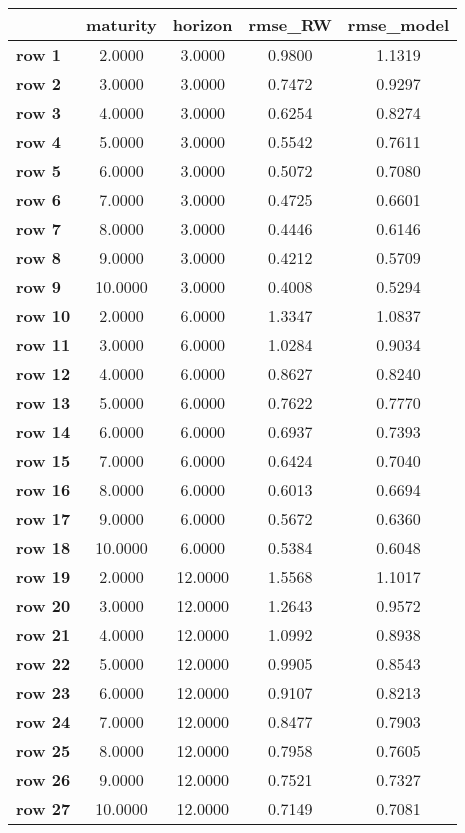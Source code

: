 \begin{tiny}\begin{tabular}{|l|c|c|c|c|}
\hline
&\textbf{maturity}&\textbf{horizon}&\textbf{rmse_RW}&\textbf{rmse_model}\\\hline
\textbf{row 1}&2.0000&3.0000&0.9800&1.1319\\\hline
\textbf{row 2}&3.0000&3.0000&0.7472&0.9297\\\hline
\textbf{row 3}&4.0000&3.0000&0.6254&0.8274\\\hline
\textbf{row 4}&5.0000&3.0000&0.5542&0.7611\\\hline
\textbf{row 5}&6.0000&3.0000&0.5072&0.7080\\\hline
\textbf{row 6}&7.0000&3.0000&0.4725&0.6601\\\hline
\textbf{row 7}&8.0000&3.0000&0.4446&0.6146\\\hline
\textbf{row 8}&9.0000&3.0000&0.4212&0.5709\\\hline
\textbf{row 9}&10.0000&3.0000&0.4008&0.5294\\\hline
\textbf{row 10}&2.0000&6.0000&1.3347&1.0837\\\hline
\textbf{row 11}&3.0000&6.0000&1.0284&0.9034\\\hline
\textbf{row 12}&4.0000&6.0000&0.8627&0.8240\\\hline
\textbf{row 13}&5.0000&6.0000&0.7622&0.7770\\\hline
\textbf{row 14}&6.0000&6.0000&0.6937&0.7393\\\hline
\textbf{row 15}&7.0000&6.0000&0.6424&0.7040\\\hline
\textbf{row 16}&8.0000&6.0000&0.6013&0.6694\\\hline
\textbf{row 17}&9.0000&6.0000&0.5672&0.6360\\\hline
\textbf{row 18}&10.0000&6.0000&0.5384&0.6048\\\hline
\textbf{row 19}&2.0000&12.0000&1.5568&1.1017\\\hline
\textbf{row 20}&3.0000&12.0000&1.2643&0.9572\\\hline
\textbf{row 21}&4.0000&12.0000&1.0992&0.8938\\\hline
\textbf{row 22}&5.0000&12.0000&0.9905&0.8543\\\hline
\textbf{row 23}&6.0000&12.0000&0.9107&0.8213\\\hline
\textbf{row 24}&7.0000&12.0000&0.8477&0.7903\\\hline
\textbf{row 25}&8.0000&12.0000&0.7958&0.7605\\\hline
\textbf{row 26}&9.0000&12.0000&0.7521&0.7327\\\hline
\textbf{row 27}&10.0000&12.0000&0.7149&0.7081\\\hline
\end{tabular}
\end{tiny}